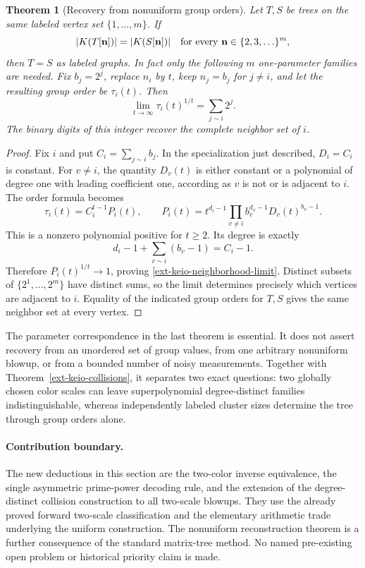 \documentclass[11pt,a4paper]{article}
\newtheorem{theorem}{Theorem}[section]
\theoremstyle{definition}\newtheorem{definition}[theorem]{Definition}
\theoremstyle{remark}\newtheorem{remark}[theorem]{Remark}
\numberwithin{equation}{section}
\begin{document}
\begin{theorem}[Recovery from nonuniform group orders]
\label{ext-keio-labeled-recovery}
Let $T,S$ be trees on the same labeled vertex set $\{1,\ldots,m\}$.
If
\[
 |K(T[\mathbf n])|=|K(S[\mathbf n])|
 \quad\hbox{for every }\mathbf n\in\{2,3,\ldots\}^m,
\]
then $T=S$ as labeled graphs.  In fact only the following $m$ one-parameter
families are needed.  Fix $b_j=2^j$, replace $n_i$ by $t$, keep
$n_j=b_j$ for $j\ne i$, and let the resulting group order be $\tau_i(t)$.
Then
\begin{equation}
 \lim_{t\to\infty}\tau_i(t)^{1/t}
       =\sum_{j\sim i}2^j.                                 \label{ext-keio-neighborhood-limit}
\end{equation}
The binary digits of this integer recover the complete neighbor set of $i$.
\end{theorem}

\begin{proof}
Fix $i$ and put $C_i=\sum_{j\sim i}b_j$.  In the specialization just
described, $D_i=C_i$ is constant.  For $v\ne i$, the quantity $D_v(t)$ is
either constant or a polynomial of degree one with leading coefficient one,
according as $v$ is not or is adjacent to $i$.  The order formula becomes
\[
 \tau_i(t)=C_i^{t-1}P_i(t),\qquad
 P_i(t)=t^{d_i-1}
       \prod_{v\ne i}b_v^{d_v-1}D_v(t)^{b_v-1}.
\]
This is a nonzero polynomial positive for $t\geq2$.  Its degree is exactly
\[
 d_i-1+\sum_{v\sim i}(b_v-1)=C_i-1.
\]
Therefore $P_i(t)^{1/t}\to1$, proving
\eqref{ext-keio-neighborhood-limit}.  Distinct subsets of
$\{2^1,\ldots,2^m\}$ have distinct sums, so the limit determines precisely
which vertices are adjacent to $i$.  Equality of the indicated group orders
for $T,S$ gives the same neighbor set at every vertex.
\end{proof}

The parameter correspondence in the last theorem is essential.  It does not
assert recovery from an unordered set of group values, from one arbitrary
nonuniform blowup, or from a bounded number of noisy measurements.  Together
with Theorem~\ref{ext-keio-collisions}, it separates two exact questions:
two globally chosen color scales can leave superpolynomial degree-distinct
families indistinguishable, whereas independently labeled cluster sizes
determine the tree through group orders alone.

\paragraph{Contribution boundary.}
The new deductions in this section are the two-color inverse equivalence,
the single asymmetric prime-power decoding rule, and the extension of the
degree-distinct collision construction to all two-scale blowups.  They use
the already proved forward two-scale classification and the elementary
arithmetic trade underlying the uniform construction.  The nonuniform
reconstruction theorem is a further consequence of the standard
matrix-tree method.  No named pre-existing open problem or historical
priority claim is made.
\end{document}
